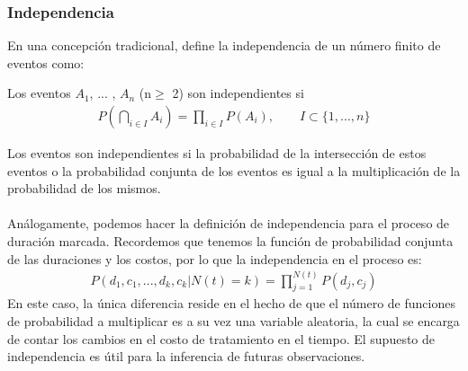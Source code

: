 \subsubsection{Independencia}
En una concepci\'on tradicional, \cite{resnickpath} define la independencia de un n\'umero finito de eventos como:\\
\begin{defi}
Los eventos $A_1$, ... , $A_n$ (n$\geq$ 2) son independientes si
\begin{align*}
P(\bigcap_{i \in I} A_i) = \prod_{i \in I} P(A_i), \qquad I \subset\{1,...,n\}
\end{align*}
\end{defi}
Los eventos son independientes si la probabilidad de la intersecci\'on de estos eventos o la probabilidad conjunta de los eventos es igual a la multiplicaci\'on de la probabilidad de los mismos.\\
\\
An\'alogamente, podemos hacer la definici\'on de independencia para el proceso de duraci\'on marcada. Recordemos que tenemos la funci\'on de probabilidad conjunta de las duraciones y los costos, por lo que la independencia en el proceso es:
\begin{align*}
P(d_1,c_1,...,d_k,c_k|N(t)=k)=\prod_{j=1}^{N(t)} P(d_j,c_j)
\end{align*}
En este caso, la \'unica diferencia reside en el hecho de que el n\'umero de funciones de probabilidad a multiplicar es a su vez una variable aleatoria, la cual se encarga de contar los cambios en el costo de tratamiento en el tiempo. El supuesto de independencia es \'util para la inferencia de futuras observaciones.
